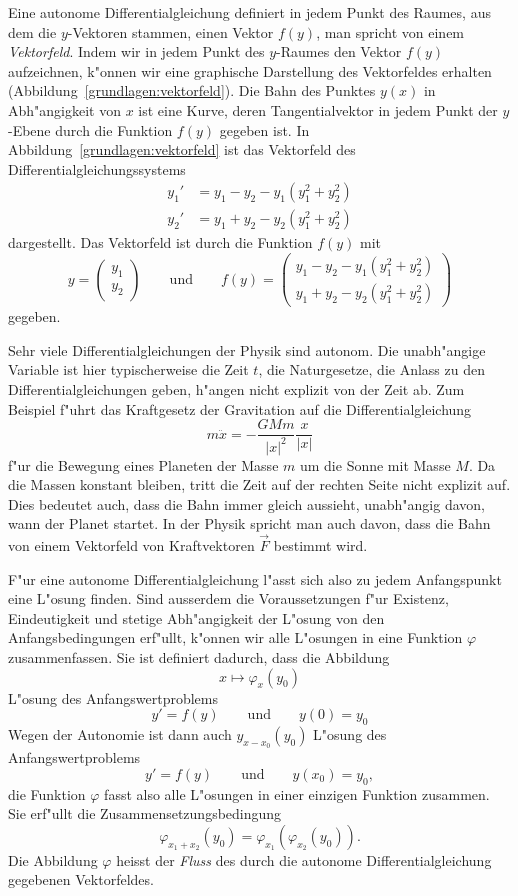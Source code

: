 Eine autonome Differentialgleichung definiert in jedem Punkt des
Raumes, aus dem die $y$-Vektoren stammen, einen Vektor $f(y)$,
man spricht von einem {\em Vektorfeld}.
Indem wir in jedem Punkt des $y$-Raumes den Vektor $f(y)$ aufzeichnen,
k"onnen wir eine graphische Darstellung des Vektorfeldes erhalten
(Abbildung~\ref{grundlagen:vektorfeld}).
Die Bahn des Punktes $y(x)$ in Abh"angigkeit von $x$ ist eine Kurve,
deren Tangentialvektor in jedem Punkt der $y$-Ebene durch die Funktion
$f(y)$ gegeben ist.
In Abbildung~\ref{grundlagen:vektorfeld} ist das Vektorfeld des
Differentialgleichungssystems
\begin{equation}
\begin{aligned}
y_1'&=y_1-y_2-y_1(y_1^2+y_2^2)\\
y_2'&=y_1+y_2-y_2(y_1^2+y_2^2)
\end{aligned}
\label{grundlagen:hopfsystem}
\end{equation}
dargestellt.
Das Vektorfeld ist durch die Funktion $f(y)$ mit
\[
y=\begin{pmatrix}y_1\\y_2\end{pmatrix}
\qquad\text{und}\qquad
f(y)=\begin{pmatrix}
y_1-y_2-y_1(y_1^2+y_2^2)\\
y_1+y_2-y_2(y_1^2+y_2^2)
\end{pmatrix}
\]
gegeben.

Sehr viele Differentialgleichungen der Physik sind autonom.
Die unabh"angige Variable ist hier typischerweise die Zeit $t$, die
Naturgesetze, die Anlass zu den Differentialgleichungen geben,
h"angen nicht explizit von der Zeit ab. 
Zum Beispiel f"uhrt das Kraftgesetz der Gravitation auf die
Differentialgleichung
\[
m\ddot x=-\frac{GMm}{|x|^2}\frac{x}{|x|}
\]
f"ur die Bewegung eines Planeten der Masse $m$ um die Sonne mit Masse $M$.
Da die Massen konstant bleiben, tritt die Zeit auf der rechten Seite nicht
explizit auf.
Dies bedeutet auch, dass die Bahn immer gleich aussieht, unabh"angig
davon, wann der Planet startet.
In der Physik spricht man auch davon, dass die Bahn von einem 
Vektorfeld von Kraftvektoren $\vec F$ bestimmt wird.

F"ur eine autonome Differentialgleichung l"asst sich also zu jedem
Anfangspunkt eine L"osung finden.
Sind ausserdem die Voraussetzungen f"ur Existenz, Eindeutigkeit
und stetige Abh"angigkeit der L"osung von den Anfangsbedingungen erf"ullt,
k"onnen wir alle L"osungen in eine Funktion $\varphi$ zusammenfassen.
Sie ist definiert dadurch, dass
die Abbildung
\[
x\mapsto \varphi_x(y_0)
\]
L"osung des Anfangswertproblems
\[
y'=f(y)
\qquad\text{und}\qquad 
y(0)=y_0
\]
Wegen der Autonomie ist dann auch $y_{x-x_0}(y_0)$ L"osung des
Anfangswertproblems
\[
y'=f(y)
\qquad\text{und}\qquad 
y(x_0)=y_0,
\]
die Funktion $\varphi$ fasst also alle L"osungen in einer einzigen
Funktion zusammen.
Sie erf"ullt die Zusammensetzungsbedingung
\[
\varphi_{x_1+x_2}(y_0)=\varphi_{x_1}(\varphi_{x_2}(y_0)).
\]
Die Abbildung $\varphi$ heisst der {\em Fluss} des durch die autonome 
Differentialgleichung gegebenen Vektorfeldes.


